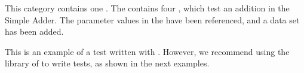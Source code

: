
This category contains one \gdcase{}. The \gdcase{} contains four \gdsteps{}, which test an addition in the Simple Adder. The parameter values in the \gdsteps{} have been referenced, and a data set has been added. 

This is an example of a test written with \gdsteps{}. However, we recommend using the library of \gdcases{} to write tests, as shown in the next examples. 
